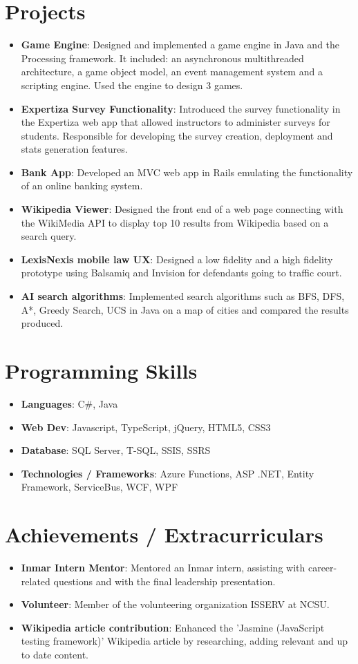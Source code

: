 \documentclass[letterpaper,11pt]{article}
\newcommand{\resumeItem}[2]{
  \item\small{
    \textbf{#1}{: #2 \vspace{-2pt}}
  }
}
\newcommand{\resumeSubItem}[2]{\resumeItem{#1}{#2}\vspace{-4pt}}
\newcommand{\resumeSubHeadingListStart}{\begin{itemize}[leftmargin=*]}
\newcommand{\resumeSubHeadingListEnd}{\end{itemize}}
\begin{document}

\section{Projects}
  \resumeSubHeadingListStart
    \resumeSubItem{Game Engine}
      {Designed and implemented a game engine in Java and the Processing framework. It included: an asynchronous multithreaded architecture, a game object model, an event management system and a scripting engine. Used the engine to design 3 games.}
    \resumeSubItem{Expertiza Survey Functionality}
      {Introduced the survey functionality in the Expertiza web app that allowed instructors to administer surveys for students. Responsible for developing the survey creation, deployment and stats generation features.}
    \resumeSubItem{Bank App}
      {Developed an MVC web app in Rails emulating the functionality of an online banking system.}
    \resumeSubItem{Wikipedia Viewer}
      {Designed the front end of a web page connecting with the WikiMedia API to display top 10 results from Wikipedia based on a search query.}
    \resumeSubItem{LexisNexis mobile law UX}
      {Designed a low fidelity and a high fidelity prototype using Balsamiq and Invision for defendants going to traffic court.}
      \resumeSubItem{AI search algorithms}
      {Implemented search algorithms such as BFS, DFS, A*, Greedy Search, UCS in Java on a map of cities and compared the results produced.}
  \resumeSubHeadingListEnd


\section{Programming Skills}
  \resumeSubHeadingListStart
    \resumeSubItem{Languages}{C\#, Java}
    \resumeSubItem{Web Dev}{Javascript, TypeScript, jQuery, HTML5, CSS3}
    \resumeSubItem{Database}{SQL Server, T-SQL, SSIS, SSRS}    
    \resumeSubItem{Technologies / Frameworks}{Azure Functions, ASP .NET, Entity Framework, ServiceBus, WCF, WPF}
  \resumeSubHeadingListEnd


\section{Achievements / Extracurriculars}
  \resumeSubHeadingListStart
    \resumeSubItem{Inmar Intern Mentor}
      {Mentored an Inmar intern, assisting with career-related questions and with the final leadership presentation.}
    \resumeSubItem{Volunteer}
      {Member of the volunteering organization ISSERV at NCSU.}
    \resumeSubItem{Wikipedia article contribution}
      {Enhanced the 'Jasmine (JavaScript testing framework)' Wikipedia article by researching, adding relevant and up to date content.}
  \resumeSubHeadingListEnd

\end{document}
